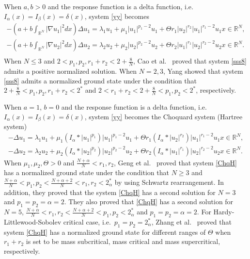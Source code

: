 \documentclass[reqno]{amsart}
\begin{document}
When $a,b>0$ and the response function is a delta function,
i.e.\ $I_\alpha(x)=I_\beta(x)=\delta(x)$,
system \eqref{yy} becomes
\begin{equation}\label{sss8}
\begin{gathered}
 -(a+b\int_{\mathbb{R}^N}|\nabla u_1|^2dx)\Delta u_1=\lambda_1 u_1+\mu_1|u_1|^{p_1-2}u_1+
 \Theta r_1|u_2|^{r_2}|u_1|^{r_1-2}u_1   x\in\mathbb{R}^N,\\
-(a+b\int_{\mathbb{R}^N}|\nabla u_2|^2dx)\Delta u_2=\lambda_2 u_2+\mu_2|u_2|^{p_2-2}u_2+
 \Theta r_2|u_1|^{r_1}|u_2|^{r_2-2}u_2   x\in\mathbb{R}^N.\\
 \end{gathered}
\end{equation}
When $N\leq3$ and $2<p_1,p_2,r_1+r_2<2+\frac{8}{N}$, Cao et al.\
 \cite{kf2} proved that system \eqref{sss8} admits a positive
normalized solution. When $N=2,3$, Yang \cite{Kf3} showed that system
\eqref{sss8} admits a normalized ground state under the condition that
$2+\frac{8}{N}<p_1,p_2,r_1+r_2<2^*$ and $2<r_1+r_2<2+\frac{8}{N}<p_1,p_2<2^*$,
respectively.

When $a=1$, $b=0$ and the response function is a delta function, i.e.\
$I_\alpha(x)=I_\beta(x)=\delta(x)$,
system \eqref{yy} becomes the   Choquard system (Hartree system)
\begin{equation}\label{ChqH}
 \begin{gathered}
-\Delta u_1=\lambda_1 u_1+\mu_1(I_\alpha\ast|u_1|^{p_1})|u_1|^{p_1-2}u_1
+\Theta r_1(I_\alpha\ast|u_2|^{r_2})|u_1|^{r_1-2}u_1   x\in\mathbb{R}^N,\\
-\Delta u_2=\lambda_2 u_2+\mu_2(I_\alpha\ast|u_2|^{p_2})|u_2|^{p_2-2}u_2
+\Theta r_2(I_\alpha\ast|u_1|^{r_1})|u_2|^{r_2-2}u_2   x\in\mathbb{R}^N.
 \end{gathered}
\end{equation}
When $\mu_1,\mu_2,\Theta>0$ and $\frac{N+\alpha}{N}<r_1,r_2$, Geng et al.\
\cite{JFx} proved that system \eqref{ChqH}
has a normalized ground state under the condition that $N\geq3$ and
$\frac{N+\alpha}{N}<p_1,p_2<\frac{N+\alpha+2}{N}<r_1,r_2<2_\alpha^*$
by using Schwartz rearrangement. In addition, they proved that the system
\eqref{ChqH} has a second solution
for $N=3$ and $p_1=p_2=\alpha=2$.
They also proved that  \eqref{ChqH} has a second solution
for $N=5$, $\frac{N+\alpha}{N}<r_1,r_2<\frac{N+\alpha+2}{N}<p_1,p_2<2_\alpha^*$ and
$p_1=p_2=\alpha=2$. For
Hardy-Littlewood-Sobolev critical case, i.e.\ $p_1=p_2=2_\alpha^*$, Zhang et al.\
\cite{linjie} proved that system \eqref{ChqH}
has a normalized ground state for different ranges of $\Theta$ when $r_1+r_2$ is set
to be mass subcritical, mass critical and mass supercritical, respectively.
\end{document}

